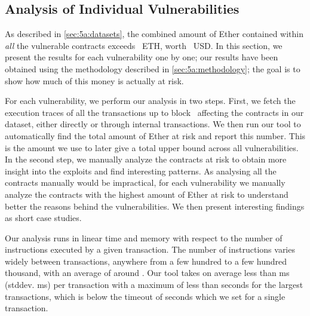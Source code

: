 


\subsection{Analysis of Individual Vulnerabilities}
\label{sec:5a:analysis}

As described in \autoref{sec:5a:datasets}, the combined amount of Ether contained within \emph{all} the vulnerable contracts exceeds~ ETH, worth~ USD. In this section, we present the results for each vulnerability one by one; our results have been obtained using the methodology described in \autoref{sec:5a:methodology}; the goal is to show how much of this money is actually at risk.

For each vulnerability, we perform our analysis in two steps.
First, we fetch the execution traces of all the transactions up to block~ affecting the contracts in our dataset, either directly or through internal transactions. We then run our tool to automatically find the total amount of Ether at risk and report this number.
This is the amount we use to later give a total upper bound across all vulnerabilities.
In the second step, we manually analyze the contracts at risk to obtain more insight into the exploits and find interesting patterns.
As analysing all the contracts manually would be impractical, for each vulnerability we manually analyze the contracts with the highest amount of Ether at risk to understand better the reasons behind the vulnerabilities.
We then present interesting findings as short case studies.

 Our analysis runs in linear time and memory with respect to the number of instructions executed by a given transaction. The number of instructions varies widely between transactions, anywhere from a few hundred to a few hundred thousand, with an average of around . Our tool takes on average less than ms (stddev. ms) per transaction with a maximum of less than  seconds for the largest transactions, which is below the timeout of  seconds which we set for a single transaction.


